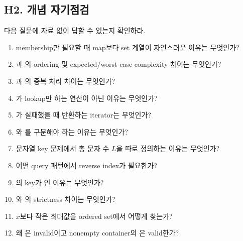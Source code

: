 \subsection{H2. 개념 자기점검}
다음 질문에 자료 없이 답할 수 있는지 확인하라.
\begin{enumerate}
\item membership만 필요할 때 map보다 set 계열이 자연스러운 이유는 무엇인가?
\item {}과 의 ordering 및 expected/worst-case complexity 차이는 무엇인가?
\item {}과 의 중복 처리 차이는 무엇인가?
\item {}가 lookup만 하는 연산이 아닌 이유는 무엇인가?
\item {}가 실패했을 때 반환하는 iterator는 무엇인가?
\item {}와 를 구분해야 하는 이유는 무엇인가?
\item 문자열 key 문제에서 총 문자 수 $L$을 따로 정의하는 이유는 무엇인가?
\item 어떤 query 패턴에서 reverse index가 필요한가?
\item {}의 key가 인 이유는 무엇인가?
\item {}와 의 strictness 차이는 무엇인가?
\item $x$보다 작은 최대값을 ordered set에서 어떻게 찾는가?
\item 왜 은 invalid이고 nonempty container의 은 valid한가?
\end{enumerate}

